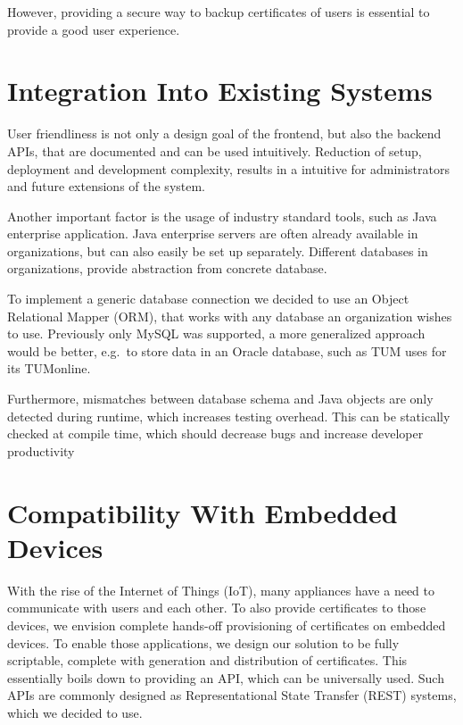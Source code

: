 However, providing a secure way to backup certificates of users is essential to provide a good user experience.


\section{Integration Into Existing Systems}\label{sec:integrationIntoExistingSystems}
User friendliness is not only a design goal of the frontend, but also the backend APIs, that are documented and can be
used intuitively.
Reduction of setup, deployment and development complexity, results in a intuitive for administrators and future
extensions of the system.

Another important factor is the usage of industry standard tools, such as Java enterprise application.
Java enterprise servers are often already available in organizations, but can also easily be set up separately.
Different databases in organizations, provide abstraction from concrete database.

To implement a generic database connection we decided to use an Object Relational Mapper (ORM), that works with any
database an organization wishes to use.
Previously only MySQL was supported, a more generalized approach would be better, e.g.\ to store data in an Oracle
database, such as TUM uses for its TUMonline.

Furthermore, mismatches between database schema and Java objects are only detected during runtime, which increases
testing overhead.
This can be statically checked at compile time, which should decrease bugs and increase developer productivity

\section{Compatibility With Embedded Devices}\label{sec:compatibilityWithEmbeddedDevices}
With the rise of the Internet of Things (IoT), many appliances have a need to communicate with users and each other.
To also provide certificates to those devices, we envision complete hands-off provisioning of certificates on embedded
devices.
To enable those applications, we design our solution to be fully scriptable, complete with generation and distribution
of certificates.
This essentially boils down to providing an API, which can be universally used.
Such APIs are commonly designed as Representational State Transfer (REST) systems, which we decided to use.

